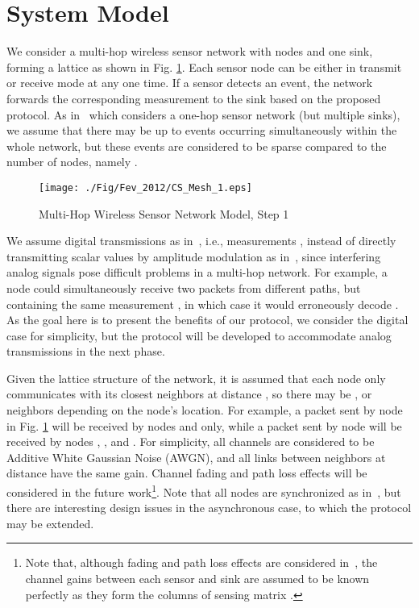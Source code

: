 \documentclass[letterpaper,conference]{IEEEtran}
\begin{document}
\section{System Model}
\label{sec SysMod}

We consider a multi-hop wireless sensor network with  nodes and one sink, forming a lattice as shown in Fig. \ref{fig:lattice1}. Each sensor node  can be either in transmit or receive mode at any one time. If a sensor detects an event, the network forwards the corresponding measurement to the sink based on the proposed protocol. As in~\cite{Men09mar} which considers a one-hop sensor network (but multiple sinks), we assume that there may be up to  events occurring simultaneously within the whole network, but these events are considered to be sparse compared to the number of nodes, namely .


\begin{figure}[h]
\begin{center}
   \texttt{[image: ./Fig/Fev\_2012/CS\_Mesh\_1.eps]}
\caption{Multi-Hop Wireless Sensor Network Model, Step 1}
\label{fig:lattice1}
\end{center}
\end{figure}

We assume digital transmissions as in~\cite{Men09mar}, i.e., measurements , instead of directly transmitting scalar values by amplitude modulation as in~\cite{Hau08mar}, since interfering analog signals pose difficult problems in a multi-hop network. For example, a node could simultaneously receive two packets from different paths, but containing the same measurement , in which case it would erroneously decode . As the goal here is to present the benefits of our protocol, we consider the digital case for simplicity, but the protocol will be developed to accommodate analog transmissions in the next phase.

Given the lattice structure of the network, it is assumed that each node only communicates with its closest neighbors at distance , so there may be ,  or  neighbors depending on the node's location. For example, a packet sent by node  in Fig. \ref{fig:lattice1} will be received by nodes  and  only, while a packet sent by node  will be received by nodes , ,  and .
For simplicity, all channels are considered to be Additive White Gaussian Noise (AWGN), and all links between neighbors at distance  have the same gain. Channel fading and path loss effects will be considered in the future work\footnote{Note that, although fading and path loss effects are considered in~\cite{Men09mar}, the channel gains between each sensor and sink are assumed to be known perfectly as they form the columns of sensing matrix .}. Note that all nodes are synchronized as in~\cite{Hau08mar}\cite{Men09mar}, but there are interesting design issues in the asynchronous case, to which the protocol may be extended.
\end{document}
